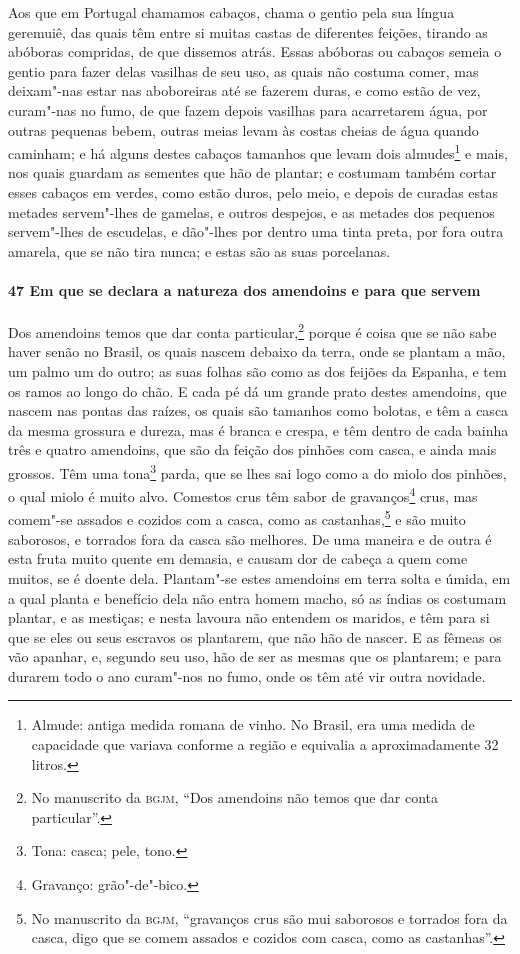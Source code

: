 \begin{linenumbers}
Aos que em Portugal chamamos cabaços, chama o gentio pela sua língua geremuiê, das quais
têm entre si muitas castas de diferentes feições, tirando as abóboras compridas, de que
dissemos atrás. Essas abóboras ou cabaços semeia o gentio para fazer delas vasilhas de seu
uso, as quais não costuma comer, mas deixam"-nas estar nas aboboreiras até se fazerem
duras, e como estão de vez, curam"-nas no fumo, de que fazem depois vasilhas para
acarretarem água, por outras pequenas bebem, outras meias levam às costas cheias de água
quando caminham; e há alguns destes cabaços tamanhos que levam dois almudes\footnote{
Almude: antiga medida romana de vinho. No Brasil, era uma medida de capacidade que variava
conforme a região e equivalia a aproximadamente 32 litros.} e mais, nos quais guardam as
sementes que hão de plantar; e costumam também cortar esses cabaços em verdes, como estão
duros, pelo meio, e depois de curadas estas metades servem"-lhes de gamelas, e outros
despejos, e as metades dos pequenos servem"-lhes de escudelas, e dão"-lhes por dentro uma
tinta preta, por fora outra amarela, que se não tira nunca; e estas são as suas
porcelanas.

\paragraph{47 Em que se declara a natureza dos amendoins e para que servem}\quad
Dos amendoins temos que dar conta particular,\footnote{ No manuscrito da \textsc{bgjm},
``Dos amendoins não temos que dar conta particular''.} porque é coisa que se não sabe
haver senão no Brasil, os quais nascem debaixo da terra, onde se plantam a mão, um palmo
um do outro; as suas folhas são como as dos feijões da Espanha, e tem os ramos ao longo do
chão. E cada pé dá um grande prato destes amendoins, que nascem nas pontas das raízes, os
quais são tamanhos como bolotas, e têm a casca da mesma grossura e dureza, mas é branca e
crespa, e têm dentro de cada bainha três e quatro amendoins, que são da feição dos pinhões
com casca, e ainda mais grossos. Têm uma tona\footnote{ Tona: casca; pele, tono.} parda,
que se lhes sai logo como a do miolo dos pinhões, o qual miolo é muito alvo. Comestos crus
têm sabor de gravanços\footnote{ Gravanço: grão"-de"-bico.} crus, mas comem"-se assados e
cozidos com a casca, como as castanhas,\footnote{ No manuscrito da \textsc{bgjm},
``gravanços crus são mui saborosos e torrados fora da casca, digo que se comem assados e
cozidos com casca, como as castanhas''.} e são muito saborosos, e torrados fora da casca
são melhores. De uma maneira e de outra é esta fruta muito quente em demasia, e causam dor
de cabeça a quem come muitos, se é doente dela.
Plantam"-se estes amendoins em terra solta e úmida, em a qual planta e
benefício dela não entra homem macho, só as índias os costumam plantar, e as mestiças; e
nesta lavoura não entendem os maridos, e têm para si que se eles ou seus escravos os
plantarem, que não hão de nascer. E as fêmeas os vão
apanhar, e, segundo seu uso, hão de ser as mesmas que os plantarem; e para durarem todo o
ano curam"-nos no fumo, onde os têm até vir outra novidade.


\end{linenumbers}
